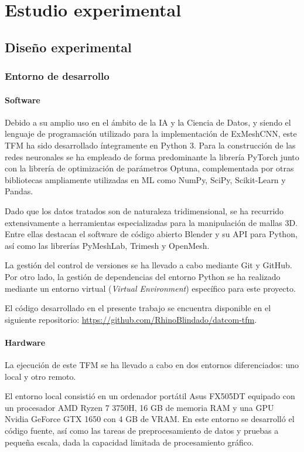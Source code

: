 \chapter{Estudio experimental}

\section{Diseño experimental}
\label{section4:implementation}
\subsection{Entorno de desarrollo}
\subsubsection{Software}
Debido a su amplio uso en el ámbito de la IA y la Ciencia de Datos, y siendo el lenguaje de programación utilizado para la implementación de ExMeshCNN, este TFM ha sido desarrollado íntegramente en Python 3. Para la construcción de las redes neuronales se ha empleado de forma predominante la librería PyTorch junto con la librería de optimización de parámetros Optuna, complementada por otras bibliotecas ampliamente utilizadas en ML como NumPy, SciPy, Scikit-Learn y Pandas.

Dado que los datos tratados son de naturaleza tridimensional, se ha recurrido extensivamente a herramientas especializadas para la manipulación de mallas 3D. Entre ellas destacan el software de código abierto Blender y su API para Python, así como las librerías PyMeshLab, Trimesh y OpenMesh.

La gestión del control de versiones se ha llevado a cabo mediante Git y GitHub. Por otro lado, la gestión de dependencias del entorno Python se ha realizado mediante un entorno virtual (\textit{Virtual Environment}) específico para este proyecto.

El código desarrollado en el presente trabajo se encuentra disponible en el siguiente repositorio: \url{https://github.com/RhinoBlindado/datcom-tfm}.

\subsubsection{Hardware}
La ejecución de este TFM se ha llevado a cabo en dos entornos diferenciados: uno local y otro remoto.

El entorno local consistió en un ordenador portátil Asus FX505DT equipado con un procesador AMD Ryzen 7 3750H, 16 GB de memoria RAM y una GPU Nvidia GeForce GTX 1650 con 4 GB de VRAM. En este entorno se desarrolló el código fuente, así como las tareas de preprocesamiento de datos y pruebas a pequeña escala, dada la capacidad limitada de procesamiento gráfico.

